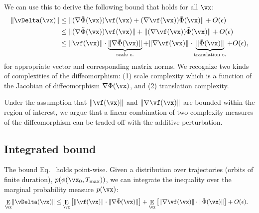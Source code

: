 \documentclass{article}
\theoremstyle{definition} \newtheorem{definition}{Definition}  \newtheorem{example}{Example}
\theoremstyle{remark} \newtheorem{remark}{Remark}
\renewcommand{\eqref}{Eq.~\originaleqref}
\newcounter{ct}
\newcommand{\divv}{\ensuremath{\mathbb{D}}}
\newcommand{\IMPdivv}[3]{\divv_{\text{IMP}}\!\left({#1}\middle\lvert\middle\rvert\,{#2}\,;{#3}\right)}
\DeclarePairedDelimiter{\norm}{\lVert}{\rVert}
\DeclareMathOperator*{\E}{\rm E} %
\newcommand{\homeo}{\Phi} %
\begin{document}
We can use this to derive the following bound that holds for all $\vx$:
\begin{align}
    \norm{\vDelta(\vx)}
    &\leq
	\norm{(\nabla\tilde\homeo(\vx)) \vf(\vx)
	+
	(\nabla\vf(\vx)) \tilde\homeo(\vx)}
	+ O(\epsilon)
    \\
    &\leq
	\norm{(\nabla\tilde\homeo(\vx)) \vf(\vx)}
	+
	\norm{(\nabla\vf(\vx)) \tilde\homeo(\vx)}
	+ O(\epsilon)
    \\
    &\leq
	\norm{\vf(\vx)}
	\cdot
	\underbrace{
	    \norm{\nabla\tilde\homeo(\vx)}
	}_{\substack{\text{scale c.}}}
	+
	\norm{\nabla\vf(\vx)}
	\cdot
	\underbrace{
	\norm{\tilde\homeo(\vx)}
	}_{\substack{\text{translation c.}}}
	+ O(\epsilon),
    \label{eq:h:bound}
\end{align}
for appropriate vector and corresponding matrix norms.
We recognize two kinds of complexities of the diffeomorphism: (1) scale complexity which is a function of the Jacobian of diffeomorphism $\nabla\homeo(\vx)$, and (2) translation complexity.

Under the assumption that $\norm{\vf(\vx)}$ and $\norm{\nabla\vf(\vx)}$ are bounded within the region of interest, we argue that a linear combination of two complexity measures of the diffeomorphism can be traded off with the additive perturbation.



\subsection{Integrated bound}
The bound \eqref{eq:h:bound} holds point-wise.
Given a distribution over trajectories (orbits of finite duration),
$p(\phi(\vx_0,T_\text{max}))$, we can integrate the inequality over the marginal probability measure $p(\vx)$:
\begin{align}\label{eq:h:bound:integrated}
    \E_\vx \norm{\vDelta(\vx)}
    &\leq
	\E_\vx
	\left[
	    \norm{\vf(\vx)}
	    \cdot
	    \norm{\nabla\tilde\homeo(\vx)}
	\right]
	+
	\E_\vx
	\left[
	    \norm{\nabla\vf(\vx)}
	    \cdot
	    \norm{\tilde\homeo(\vx)}
	\right]
	+ O(\epsilon).
\end{align}

\end{document}

